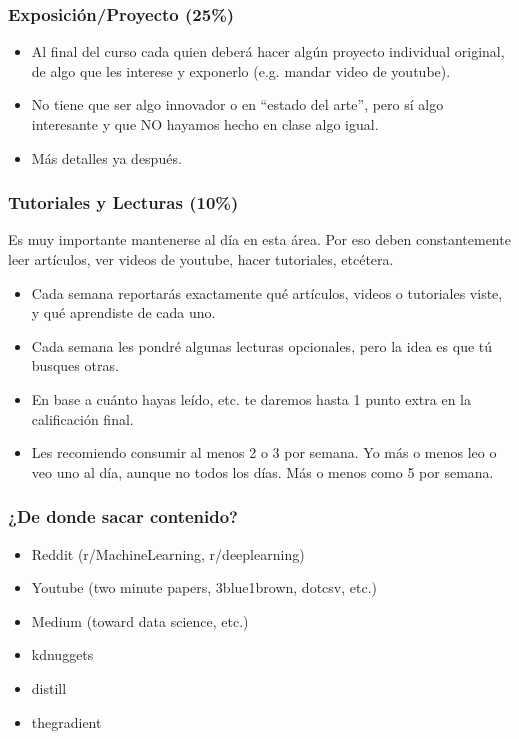 \documentclass[spanish]{beamer}
\def\tcg#1{\textcolor{MyGreen}{#1}}
\begin{document}
\begin{frame}\frametitle{Exposición/Proyecto (25\%)}
 \begin{itemize}
  \item Al final del curso cada quien deberá hacer algún \tcg{proyecto individual} original, de algo que les interese y exponerlo (e.g. mandar video de youtube).\pause
  \item No tiene que ser algo innovador o en ``estado del arte'', pero sí algo interesante y que NO hayamos hecho en clase algo igual.\pause
  \item Más detalles ya después.
 \end{itemize}
\end{frame}


\begin{frame}\frametitle{Tutoriales y Lecturas (10\%)}
Es muy importante mantenerse al día en esta área. Por eso deben constantemente leer artículos, ver videos de youtube, hacer tutoriales, etcétera.\pause
 \begin{itemize}
  \item Cada semana reportarás exactamente qué artículos, videos o tutoriales viste, y qué aprendiste de cada uno.\pause
  \item Cada semana les pondré algunas lecturas opcionales, pero la idea es que tú busques otras. \pause
  \item En base a cuánto hayas leído, etc. te daremos hasta 1 punto extra en la calificación final.\pause
  \item Les recomiendo consumir al menos 2 o 3 por semana. Yo más o menos leo o veo uno al día, aunque no todos los días. Más o menos como 5 por semana.
 \end{itemize}
\end{frame}

\begin{frame}\frametitle{¿De donde sacar contenido?}
 \begin{itemize}
  \item Reddit (r/MachineLearning, r/deeplearning)
  \item Youtube (two minute papers, 3blue1brown, dotcsv, etc.)
  \item Medium (toward data science, etc.)
  \item kdnuggets
  \item distill
  \item thegradient
 \end{itemize}
\end{frame}
\end{document}

